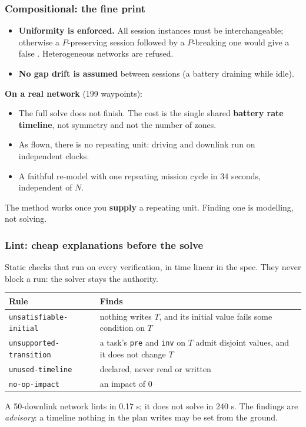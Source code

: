 \begin{frame}
  \frametitle{Compositional: the fine print} \small

\begin{itemize}
\item {\bf Uniformity is enforced.} All session instances must be interchangeable;
      otherwise a $P$-preserving session followed by a $P$-breaking one would give a false \holds{}.
      Heterogeneous networks are refused.
\item {\bf No gap drift is assumed} between sessions (a battery draining while idle).
\end{itemize}

\pause
\vspace{0.3cm}
{\bf On a real \mexec{} network} (199 waypoints):

\begin{itemize}
\item The full solve does not finish. The cost is the single shared {\bf battery rate timeline},
      not symmetry and not the number of zones.
\item As flown, there is no repeating unit: driving and downlink run on independent clocks.
\item A faithful re-model with one repeating mission cycle \holds{} in 34 seconds, independent of $N$.
\end{itemize}

\vspace{0.2cm}
The method works once you {\bf supply} a repeating unit. Finding one is modelling, not solving.

\end{frame}

\begin{frame}
  \frametitle{Lint: cheap explanations before the solve} \small

Static checks that run on every verification, in time linear in the spec. They never
block a run: the solver stays the authority.

\vspace{0.3cm}
{\centering
\renewcommand{\arraystretch}{1.25}
\begin{tabular}{lp{7.3cm}}
\toprule
{\bf Rule} & {\bf Finds} \\
\midrule
{\tt unsatisfiable-initial}  & nothing writes $T$, and its initial value fails some condition on $T$ \\
{\tt unsupported-transition} & a task's {\tt pre} and {\tt inv} on $T$ admit disjoint values, and it does not change $T$ \\
{\tt unused-timeline}        & declared, never read or written \\
{\tt no-op-impact}           & an impact of 0 \\
\bottomrule
\end{tabular}\par}

\vspace{0.3cm}
A 50-downlink \mexec{} network lints in 0.17 s; it does not solve in 240 s.
The findings are {\em advisory}: a timeline nothing in the plan writes may be set from the ground.

\end{frame}
